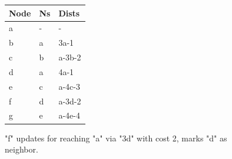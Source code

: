 \documentclass[12pt, oneandhalf, chaparabic, sees, ms]{metu}
\begin{document}
\begin{center}
\begin{figure}[!htp]
\begin{center}
\begin{minipage}{0.3\textwidth}
        \begin{tabular}{ | l | l | l | }
    \hline
    \rowcolor{lightgray}
    Node & Ns & Dists \\ \hline \hline
    a    & -  & -     \\ \hline
    b    & a  & 3a-1   \\ \hline
    c    & b  & a-3b-2 \\ \hline
    d    & a  & 4a-1   \\ \hline
    e    & c  & a-4c-3 \\ \hline
     \rowcolor{black!50}
    f    & d  & a-3d-2 \\ \hline
    g    & e  & a-4e-4 \\
    \hline
   \end{tabular}
   \end{minipage}
   
   \end{center}
    \caption{"f" updates for reaching "a" via "3d" with cost 2, marks "d" as neighbor.}
    \label{fig:lagoon-graph8d}
  \end{figure}
\end{center}
 
 
 
\end{document}

